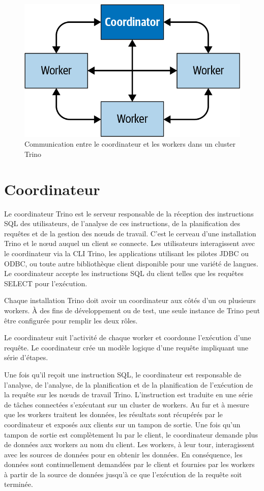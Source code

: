 \begin{figure}[htbp]
\centering
\includegraphics[width=\linewidth]{images/trino_communication.png}
\caption{Communication entre le coordinateur et les workers dans un cluster Trino}\label{fig:trino-communication}
\end{figure}

\section{Coordinateur}
Le coordinateur Trino est le serveur responsable de la réception des instructions SQL des utilisateurs, de l'analyse de ces instructions, de la planification des requêtes et de la gestion des nœuds de travail. C'est le cerveau d'une installation Trino et le nœud auquel un client se connecte. Les utilisateurs interagissent avec le coordinateur via la CLI Trino, les applications utilisant les pilotes JDBC ou ODBC, ou toute autre bibliothèque client disponible pour une variété de langues. Le coordinateur accepte les instructions SQL du client telles que les requêtes SELECT pour l'exécution.

Chaque installation Trino doit avoir un coordinateur aux côtés d'un ou plusieurs workers. À des fins de développement ou de test, une seule instance de Trino peut être configurée pour remplir les deux rôles.

Le coordinateur suit l'activité de chaque worker et coordonne l'exécution d'une requête. Le coordinateur crée un modèle logique d'une requête impliquant une série d'étapes.

Une fois qu'il reçoit une instruction SQL, le coordinateur est responsable de l'analyse, de l'analyse, de la planification et de la planification de l'exécution de la requête sur les nœuds de travail Trino. L'instruction est traduite en une série de tâches connectées s'exécutant sur un cluster de workers. Au fur et à mesure que les workers traitent les données, les résultats sont récupérés par le coordinateur et exposés aux clients sur un tampon de sortie. Une fois qu'un tampon de sortie est complètement lu par le client, le coordinateur demande plus de données aux workers au nom du client. Les workers, à leur tour, interagissent avec les sources de données pour en obtenir les données. En conséquence, les données sont continuellement demandées par le client et fournies par les workers à partir de la source de données jusqu'à ce que l'exécution de la requête soit terminée.

